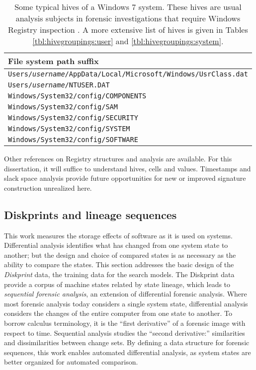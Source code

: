\documentclass[11pt]{ucthesis}
\theoremstyle{plain}
\theoremstyle{definition}
\begin{document}
\begin{table}[htp]
\caption{Some typical hives of a Windows 7 system.  These hives are usual analysis subjects in forensic investigations that require Windows Registry inspection \cite[Table 4.1]{carvey:syngress09} \cite[page 18]{carvey:syngress11}.  A more extensive list of hives is given in Tables \ref{tbl:hivegroupings:user} and \ref{tbl:hivegroupings:system}.}
\begin{center}
\begin{small}
\begin{tabular}{p{}}
\toprule
File system path suffix \\
\midrule
\texttt{Users/\emph{username}/AppData/Local/Microsoft/Windows/UsrClass.dat} \\
\texttt{Users/\emph{username}/NTUSER.DAT} \\
\texttt{Windows/System32/config/COMPONENTS} \\
\texttt{Windows/System32/config/SAM} \\
\texttt{Windows/System32/config/SECURITY} \\
\texttt{Windows/System32/config/SYSTEM} \\
\texttt{Windows/System32/config/SOFTWARE} \\
\bottomrule
\end{tabular}
\end{small}
\end{center}
\label{tbl:hivelisting}
\end{table}%

Other references on Registry structures \cite{thomassen:msthesis08,norris:mastersthesis09} and analysis \cite{carvey:syngress11} are available.  For this dissertation, it will suffice to understand hives, cells and values.  Timestamps and slack space analysis provide future opportunities for new or improved signature construction unrealized here.


\subsection{Diskprints and lineage sequences}

This work measures the storage effects of software as it is used on systems.  Differential analysis \cite{garfinkel:dfrws12a} identifies what has changed from one system state to another; but the design and choice of compared states is as necessary as the ability to compare the states.  This section addresses the basic design of the \emph{Diskprint} data, the training data for the search models.  The Diskprint data provide a corpus of machine states related by state lineage, which leads to \emph{sequential forensic analysis}, an extension of differential forensic analysis.  Where most forensic analysis today considers a single system state, differential analysis considers the changes of the entire computer from one state to another.  To borrow calculus terminology, it is the ``first derivative'' of a forensic image with respect to time.  Sequential analysis studies the ``second derivative:'' similarities and dissimilarities between change sets.  By defining a data structure for forensic sequences, this work enables automated differential analysis, as system states are better organized for automated comparison.
\end{document}
